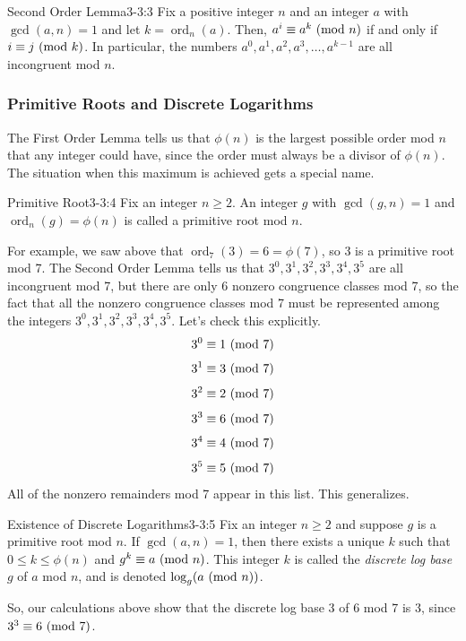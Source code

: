 \documentclass[letterpaper]{article}
\DeclareMathOperator{\ord}{ord}
\begin{document}
\begin{lemma}{Second Order Lemma}{3-3:3}
    Fix a positive integer $n$ and an integer $a$ with $\gcd(a, n) = 1$ and let $k = \ord_{n}(a)$. Then, $a^i \equiv a^k \ (\mathrm{mod}\ n)$ if and only if $i \equiv j \ (\mathrm{mod}\ k)$. In particular, the numbers $a^0, a^1, a^2, a^3, \hdots, a^{k - 1}$ are all incongruent mod $n$. 
\end{lemma}

\subsubsection{Primitive Roots and Discrete Logarithms}
The First Order Lemma tells us that $\phi(n)$ is the largest possible order mod $n$ that any integer could have, since the order must always be a divisor of $\phi(n)$. The situation when this maximum is achieved gets a special name.

\begin{definition}{Primitive Root}{3-3:4}
    Fix an integer $n \geq 2$. An integer $g$ with $\gcd(g, n) = 1$ and $\ord_{n}(g) = \phi(n)$ is called a primitive root mod $n$. 
\end{definition}
For example, we saw above that $\ord_{7}(3) = 6 = \phi(7)$, so 3 is a primitive root mod 7. The Second Order Lemma tells us that $3^0, 3^1, 3^2, 3^3, 3^4, 3^5$ are all incongruent mod 7, but there are only 6 nonzero congruence classes mod 7, so the fact that all the nonzero congruence classes mod 7 must be represented among the integers $3^0, 3^1, 3^2, 3^3, 3^4, 3^5$. Let's check this explicitly. 
\[3^0 \equiv 1 \ (\mathrm{mod}\ 7)\]
\[3^1 \equiv 3 \ (\mathrm{mod}\ 7)\]
\[3^2 \equiv 2 \ (\mathrm{mod}\ 7)\]
\[3^3 \equiv 6 \ (\mathrm{mod}\ 7)\]
\[3^4 \equiv 4 \ (\mathrm{mod}\ 7)\]
\[3^5 \equiv 5 \ (\mathrm{mod}\ 7)\]
All of the nonzero remainders mod 7 appear in this list. This generalizes. 
\begin{lemma}{Existence of Discrete Logarithms}{3-3:5}
    Fix an integer $n \geq 2$ and suppose $g$ is a primitive root mod $n$. If $\gcd(a, n) = 1$, then there exists a unique $k$ such that $0 \leq k \leq \phi(n)$ and $g^k \equiv a \ (\mathrm{mod}\ n)$. This integer $k$ is called the \emph{discrete log base} $g$ of $a$ mod $n$, and is denoted $\log_{g}(a \ (\mathrm{mod}\ n))$.
\end{lemma}
So, our calculations above show that the discrete log base 3 of 6 mod 7 is 3, since $3^3 \equiv 6 \ (\mathrm{mod}\ 7)$. 
\end{document}
